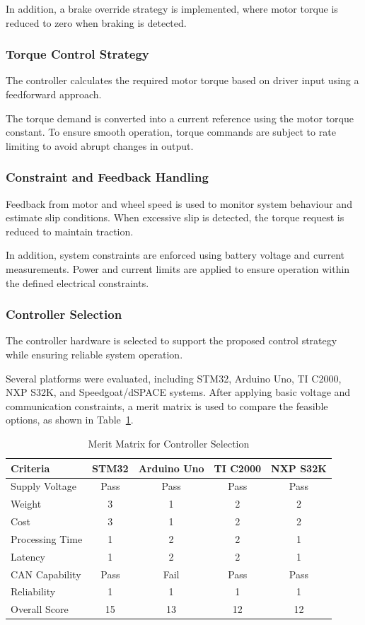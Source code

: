 \documentclass[a4paper,12pt]{article}
\begin{document}
In addition, a brake override strategy is implemented, where motor torque is reduced to zero when braking is detected.

\subsubsection{Torque Control Strategy}

The controller calculates the required motor torque based on driver input using a feedforward approach.

The torque demand is converted into a current reference using the motor torque constant. To ensure smooth operation, torque commands are subject to rate limiting to avoid abrupt changes in output.

\subsubsection{Constraint and Feedback Handling}

Feedback from motor and wheel speed is used to monitor system behaviour and estimate slip conditions. When excessive slip is detected, the torque request is reduced to maintain traction.

In addition, system constraints are enforced using battery voltage and current measurements. Power and current limits are applied to ensure operation within the defined electrical constraints.

\subsubsection{Controller Selection}

The controller hardware is selected to support the proposed control strategy while ensuring reliable system operation.

Several platforms were evaluated, including STM32, Arduino Uno, TI C2000, NXP S32K, and Speedgoat/dSPACE systems. After applying basic voltage and communication constraints, a merit matrix is used to compare the feasible options, as shown in Table~\ref{tab:controller_selection}.

\begin{table}[H]
\centering
\caption{Merit Matrix for Controller Selection}
\label{tab:controller_selection}
\begin{tabular}{lcccc}
\toprule
Criteria & STM32 & Arduino Uno & TI C2000 & NXP S32K \\
\midrule
Supply Voltage & Pass & Pass & Pass & Pass \\
Weight & 3 & 1 & 2 & 2 \\
Cost & 3 & 1 & 2 & 2 \\
Processing Time & 1 & 2 & 2 & 1 \\
Latency & 1 & 2 & 2 & 1 \\
CAN Capability & Pass & Fail & Pass & Pass \\
Reliability & 1 & 1 & 1 & 1 \\
\midrule
Overall Score & 15 & 13 & 12 & 12 \\
\bottomrule
\end{tabular}
\end{table}
\end{document}

